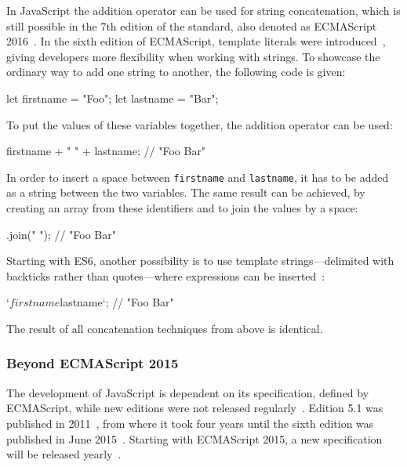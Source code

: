 In JavaScript the addition operator can be used for string concatenation, which is still possible in the 7th edition of the standard, also denoted as ECMAScript 2016~\cite{ES2016SpecOnline:Ecma:2016}. In the sixth edition of ECMAScript, template literals were introduced~\cites[p.~148]{ES6Spec:Ecma:2015}[pp.~47--48]{YDKJS:ES6AndBeyond:Simpson:2015}, giving developers more flexibility when working with strings. To showcase the ordinary way to add one string to another, the following code is given:
\begin{JsCode}[numbers=none]
let firstname = "Foo";
let lastname = "Bar";
\end{JsCode}
To put the values of these variables together, the addition operator can be used:
\begin{JsCode}[numbers=none]
firstname + " " + lastname; // "Foo Bar"
\end{JsCode}
In order to insert a space between \texttt{firstname} and \texttt{lastname}, it has to be added as a string between the two variables. The same result can be achieved, by creating an array from these identifiers and to join the values by a space:
\begin{JsCode}.join(" "); // "Foo Bar"
\end{JsCode}
Starting with ES6, another possibility is to use template strings---delimited with backticks rather than quotes---where expressions can be inserted~\cite[p.~48]{YDKJS:ES6AndBeyond:Simpson:2015}:
\begin{JsCode}[numbers=none]
`${firstname} ${lastname}`; // "Foo Bar"
\end{JsCode}
The result of all concatenation techniques from above is identical.

\subsubsection{Beyond ECMAScript 2015}

The development of JavaScript is dependent on its specification, defined by ECMAScript, while new editions were not released regularly~\cite{ECMA262Archive:Ecma}. Edition 5.1 was published in 2011~\cite{ESSpecOnline:Ecma:2011}, from where it took four years until the sixth edition was published in June 2015~\cite{ES2015SpecOnline:Ecma:2015}. Starting with ECMAScript 2015, a new specification will be released yearly~\cite{ECMAScriptNextSupportInMozilla:Mozilla:2017}.

